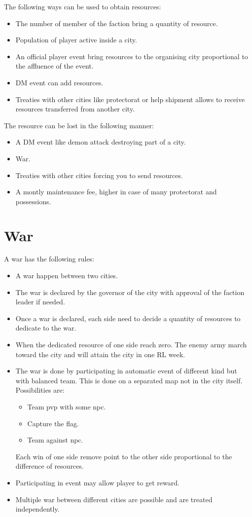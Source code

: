 \documentclass{article}
\begin{document}
The following ways can be used to obtain resources:
\begin{itemize}
	\item The number of member of the faction bring a quantity of resource.
	\item Population of player active inside a city.
	\item An official player event bring resources to the organising city proportional to the affluence of the event.
	\item DM event can add resources.
	\item Treaties with other cities like protectorat or help shipment allows to receive resources transferred from another city. 
\end{itemize}

The resource can be lost in the following manner:
\begin{itemize}
	\item A DM event like demon attack destroying part of a city.
	\item War.
	\item Treaties with other cities forcing you to send resources.
	\item A montly maintenance fee, higher in case of many protectorat and possessions.
\end{itemize}

\section{War}

A war has the following rules:
\begin{itemize}
	\item A war happen between two cities.
	\item The war is declared by the governor of the city with approval of the faction leader if needed.
	\item Once a war is declared, each side need to decide a quantity of resources to dedicate to the war.
	\item When the dedicated resource of one side reach zero. The enemy army march toward the city and will attain the city in one RL week.
	\item The war is done by participating in automatic event of different kind but with balanced team. This is done on a separated map not in the city itself. Possibilities are:
		\begin{itemize}
			\item Team pvp with some npc.
			\item Capture the flag.
			\item Team against npc.
		\end{itemize}
		Each win of one side remove point to the other side proportional to the difference of resources.
	\item Participating in event may allow player to get reward.
	\item Multiple war between different cities are possible and are treated independently.
\end{itemize}
\end{document}
